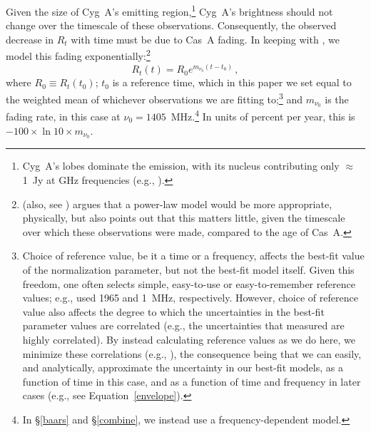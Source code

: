 \documentclass[fleqn,usenatbib]{mnras}
\begin{document}
Given the size of Cyg~A's emitting region,\footnote{Cyg~A's lobes dominate the emission, with its nucleus contributing only $\approx$1~Jy at GHz frequencies (e.g., \citealt{k81}).} Cyg~A's brightness should not change over the timescale of these observations.  Consequently, the observed decrease in $R_t$ with time must be due to Cas~A fading.  In keeping with \citet{b77}, we model this fading exponentially:\footnote{\citet{v06} (also, see \citealt{s60}) argues that a power-law model would be more appropriate, physically, but also points out that this matters little, given the timescale over which these observations were made, compared to the age of Cas~A.}
\begin{equation} \label{eq_Rmt}
R_t(t) = R_0 e^{m_{\nu_0}(t-t_0)} \, ,
\end{equation}
where $R_0 \equiv R_t(t_0)$; $t_0$ is a reference time, which in this paper we set equal to the weighted mean of whichever observations we are fitting to;\footnote{Choice of reference value, be it a time or a frequency, affects the best-fit value of the normalization parameter, but not the best-fit model itself.  Given this freedom, one often selects simple, easy-to-use or easy-to-remember reference values; e.g., \citet{b77} used 1965 and 1~MHz, respectively.  However, choice of reference value also affects the degree to which the uncertainties in the best-fit parameter values are correlated (e.g., the uncertainties that \citealt{b77} measured are highly correlated).  By instead calculating reference values as we do here, we minimize these correlations (e.g., \citealt{m17}), the consequence being that we can easily, and analytically, approximate the uncertainty in our best-fit models, as a function of time in this case, and as a function of time and frequency in later cases (e.g., see Equation~\ref{envelope}).} and $m_{\nu_0}$ is the fading rate, in this case at $\nu_0 = 1405$~MHz.\footnote{In \S\ref{baars} and \S\ref{combine}, we instead use a frequency-dependent model.}  In units of percent per year, this is $-100 \times \ln 10 \times m_{\nu_0}$.  
\end{document}
